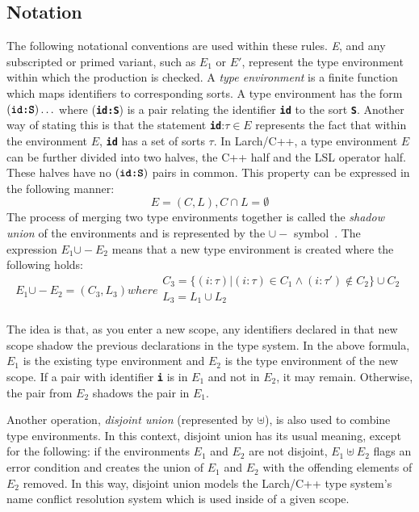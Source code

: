 \documentclass[12pt]{article} %
\newcommand{\reserved}[1]{\textbf{\texttt{#1}}} %
\newcommand{\uminus}{\mbox{$\cup\!\!\!\!-$}}
\begin{document}
\subsection{Notation}
\label{trnot}
The following notational conventions are used within these
rules. \textit{E}, and any subscripted or primed variant, such as
$E_1$ or $E'$, represent the type environment within which the
production is checked. A \emph{type environment} is a finite function
which maps identifiers to corresponding sorts. A type environment has
the form ${(\reserved{id:S})\dots}$ where (\reserved{id:S}) is a pair
relating the identifier \reserved{id} to the sort
\reserved{S}. Another way of stating this is that the statement
\reserved{id}:$\tau \in E$ represents the fact that within the
environment $E$, \reserved{id} has a set of sorts $\tau$. In
Larch/C++, a type environment $E$ can be further divided into two
halves, the C++ half and the LSL operator half. These halves have no
${(\reserved{id:S})}$ pairs in common. This property can be expressed
in the following manner:
\begin{displaymath}
E = (C,L), C \cap L = \emptyset
\end{displaymath}
The process
of merging two type environments together is called the \emph{shadow
union} of the environments and is represented by the $\uminus$
symbol~\cite{Schmidt}. The expression $E_1 \uminus E_2$ means that a new type
environment is created where the following holds:
\begin{displaymath}
E_1 \uminus E_2 = (C_3,L_3) where 
\begin{array}{l}
C_3 = \{(i:\tau) | (i:\tau) \in C_1 \wedge (i:\tau') \notin C_2\} \cup
C_2\\
L_3 = L_1 \cup L_2\\
\end{array}
\end{displaymath}

The idea is that, as you enter a new scope, any identifiers declared
in that new scope shadow the previous declarations in the type
system. In the above formula, $E_1$ is the existing type environment
and $E_2$ is the type environment of the new scope. If a pair with
identifier \reserved{i} is in $E_1$ and not in $E_2$, it may
remain. Otherwise, the pair from $E_2$ shadows the pair in $E_1$.

Another operation, \emph{disjoint union} (represented by $\uplus$), is also
used to combine type environments. In this context, 
disjoint union has its usual meaning, except for the following: if the
environments $E_1$ and $E_2$ are not disjoint, $E_1 \uplus E_2$ flags an error
condition and creates the union of $E_1$ and $E_2$ with the offending
elements of $E_2$ removed. In this way, disjoint union models the
Larch/C++ type system's name conflict resolution system which is used
inside of a given scope.
\end{document}
